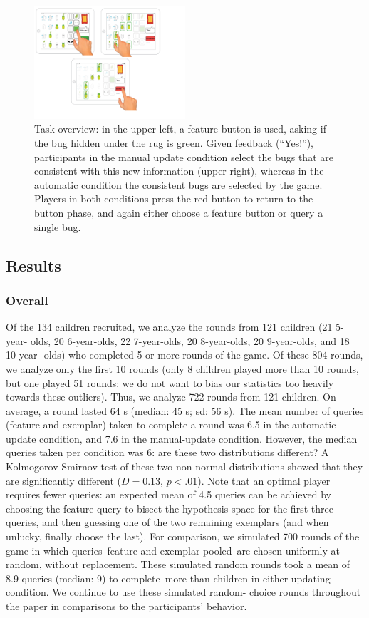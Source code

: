 \documentclass[10pt,letterpaper]{article}
\begin{document}
\begin{figure}[h]
  \centering
  \includegraphics[width=0.5\textwidth]{figures/task_overview}
  \caption{Task overview: in the upper left, a feature button is used, asking if the bug 
hidden under the rug is green. Given feedback (``Yes!''), participants in the manual 
update condition select the bugs that are consistent with this new information (upper 
right), whereas in the automatic condition the consistent bugs are selected by the 
game. Players in both conditions press the red button to return to the button phase, 
and again either choose a feature button or query a single bug.}
  \label{fig:task-overview}
\end{figure} 


\subsection{Results}

\subsubsection{Overall}

Of the 134 children recruited, we analyze the rounds from 121 children (21 5-year-
olds, 20 6-year-olds, 22 7-year-olds, 20 8-year-olds, 20 9-year-olds, and 18 10-year-
olds) who completed 5 or more rounds of the game. Of these 804 rounds, we 
analyze only the first 10 rounds (only 8 children played more than 10 rounds, but 
one played 51 rounds: we do not want to bias our statistics too heavily towards 
these outliers). Thus, we analyze 722 rounds from 121 children. On average, a 
round lasted 64 s (median: 45 s; sd: 56 s). The mean number of queries (feature 
and exemplar) taken to complete a round was 6.5 in the automatic-update condition, 
and 7.6 in the manual-update condition. However, the median queries taken per 
condition was 6: are these two distributions different? A Kolmogorov-Smirnov test of 
these two non-normal distributions showed that they are significantly different ($D = 
0.13$, $p<.01$). Note that an optimal player requires fewer queries: an expected 
mean of 4.5 queries can be achieved by choosing the feature query to bisect the 
hypothesis space for the first three queries, and then guessing one of the two 
remaining exemplars (and when unlucky, finally choose the last). For comparison, 
we simulated 700 rounds of the game in which queries--feature and exemplar 
pooled--are chosen uniformly at random, without replacement. These simulated 
random rounds took a mean of 8.9 queries (median: 9) to complete--more than 
children in either updating condition. We continue to use these simulated random-
choice rounds throughout the paper in comparisons to the participants' behavior.
\end{document}

